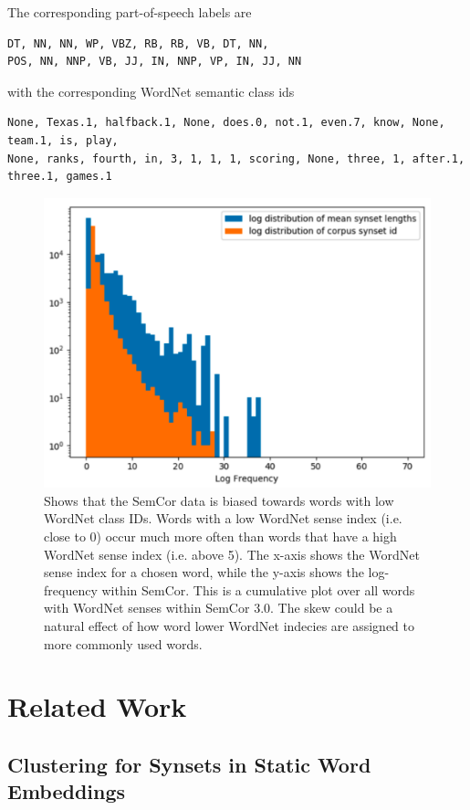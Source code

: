 \documentclass[a4paper,12pt,twoside,openright]{report}
\begin{document}
The corresponding part-of-speech labels are

\begin{verbatim}
DT, NN, NN, WP, VBZ, RB, RB, VB, DT, NN, 
POS, NN, NNP, VB, JJ, IN, NNP, VP, IN, JJ, NN
\end{verbatim}

with the corresponding WordNet semantic class ids 

\begin{verbatim}
None, Texas.1, halfback.1, None, does.0, not.1, even.7, know, None, team.1, is, play, 
None, ranks, fourth, in, 3, 1, 1, 1, scoring, None, three, 1, after.1, three.1, games.1
\end{verbatim}

\begin{figure}[h]
	\center
  \includegraphics[width=0.6\linewidth]{./assets/background/semcor_skew.png}
  \caption{Shows that the SemCor data is biased towards words with low WordNet class IDs. 
  Words with a low WordNet sense index (i.e. close to 0) occur much more often than words that have a high WordNet sense index (i.e. above 5).
  The x-axis shows the WordNet sense index for a chosen word, while the y-axis shows the log-frequency within SemCor. 
  This is a cumulative plot over all words with WordNet senses within SemCor 3.0.
  The skew could be a natural effect of how word lower WordNet indecies are assigned to more commonly used words.
  }
  \label{fig:embeddings_by_language}
\end{figure}


\chapter{Related Work}\label{section:RelatedWork} 


\section{Clustering for Synsets in Static Word Embeddings}\label{section_clustering}
\end{document}
